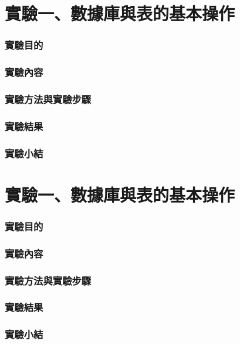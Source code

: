\documentclass[12pt, a4paper]{report}
\begin{document}
\part{實驗一、數據庫與表的基本操作}

\section{實驗目的}



\section{實驗內容}

\section{實驗方法與實驗步驟}

\section{實驗結果}

\section{實驗小結}

\part{實驗一、數據庫與表的基本操作}

\section{實驗目的}



\section{實驗內容}

\section{實驗方法與實驗步驟}

\section{實驗結果}

\section{實驗小結}
\end{document}
